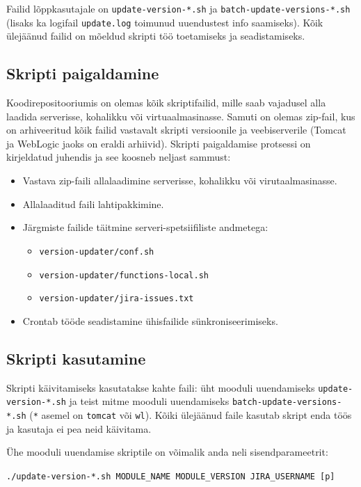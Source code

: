 \documentclass[12pt]{article}
\newcommand{\code}[1]{\texttt{#1}}
\begin{document}
   Failid lõppkasutajale on \code{update-version-*.sh} ja \code{batch-update-versions-*.sh} (lisaks ka logifail \code{update.log} toimunud uuendustest info saamiseks). Kõik ülejäänud failid on mõeldud skripti töö toetamiseks ja seadistamiseks.
   
   \newpage
      
 \subsection{Skripti paigaldamine}
  
  Koodirepositooriumis on olemas kõik skriptifailid, mille saab vajadusel alla laadida serverisse, kohalikku või virtuaalmasinasse. Samuti on olemas zip\--fail, kus on arhiveeritud kõik failid vastavalt skripti versioonile ja veebiserverile (Tomcat ja WebLogic jaoks on eraldi arhiivid). Skripti paigaldamise protsessi on kirjeldatud juhendis ja see koosneb neljast sammust:
  \begin{itemize}
    \item Vastava zip\--faili allalaadimine serverisse, kohalikku või virutaalmasinasse.
    \item Allalaaditud faili lahtipakkimine.
    \item Järgmiste failide täitmine serveri\--spetsiifiliste andmetega:
    \begin{itemize}
      \item \code{version-updater/conf.sh}
      \item \code{version-updater/functions-local.sh}
      \item \code{version-updater/jira-issues.txt}
    \end{itemize}
    \item Crontab tööde seadistamine ühisfailide sünkroniseerimiseks.
  \end{itemize}
  
  \subsection{Skripti kasutamine} 
   
  Skripti käivitamiseks kasutatakse kahte faili: üht mooduli uuendamiseks \code{update-version-*.sh} ja teist mitme mooduli uuendamiseks \code{batch-update-versions-*.sh} (\code{*} asemel on \code{tomcat} või \code{wl}). Kõiki ülejäänud faile kasutab skript enda töös ja kasutaja ei pea neid käivitama.
  
  Ühe mooduli uuendamise skriptile on võimalik anda neli sisendparameetrit:
  \begin{center}
    \small{\code{./update-version-*.sh MODULE\_NAME MODULE\_VERSION JIRA\_USERNAME [p]}}
  \end{center}
\end{document}
